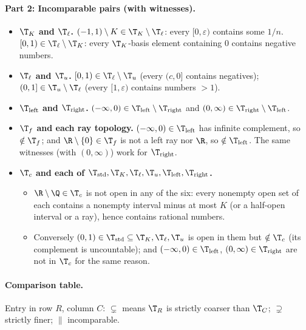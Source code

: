\paragraph{Part 2: Incomparable pairs (with witnesses).}
\begin{itemize}
  \item \textbf{$\T_K$ and $\T_\ell$.} $(-1,1)\setminus K\in\T_K\setminus\T_\ell$: every
        $[0,\varepsilon)$ contains some $1/n$. $[0,1)\in\T_\ell\setminus\T_K$: every
        $\T_K$-basis element containing $0$ contains negative numbers.
  \item \textbf{$\T_\ell$ and $\T_u$.} $[0,1)\in\T_\ell\setminus\T_u$ (every $(c,0]$ contains
        negatives); $(0,1]\in\T_u\setminus\T_\ell$ (every $[1,\varepsilon)$ contains numbers
        $>1$).
  \item \textbf{$\T_{\mathrm{left}}$ and $\T_{\mathrm{right}}$.}
        $(-\infty,0)\in\T_{\mathrm{left}}\setminus\T_{\mathrm{right}}$ and
        $(0,\infty)\in\T_{\mathrm{right}}\setminus\T_{\mathrm{left}}$.
  \item \textbf{$\T_f$ and each ray topology.} $(-\infty,0)\in\T_{\mathrm{left}}$ has infinite
        complement, so $\notin\T_f$; and $\R\setminus\{0\}\in\T_f$ is not a left ray nor $\R$,
        so $\notin\T_{\mathrm{left}}$. The same witnesses (with $(0,\infty)$) work for
        $\T_{\mathrm{right}}$.
  \item \textbf{$\T_c$ and each of $\T_{\mathrm{std}},\T_K,\T_\ell,\T_u,\T_{\mathrm{left}},
        \T_{\mathrm{right}}$.}
        \begin{itemize}[nosep]
          \item $\R\setminus\Q\in\T_c$ is not open in any of the six: every nonempty open set
                of each contains a nonempty interval minus at most $K$ (or a half-open interval
                or a ray), hence contains rational numbers.
          \item Conversely $(0,1)\in\T_{\mathrm{std}}\subseteq\T_K,\T_\ell,\T_u$ is open in them
                but $\notin\T_c$ (its complement is uncountable); and
                $(-\infty,0)\in\T_{\mathrm{left}}$, $(0,\infty)\in\T_{\mathrm{right}}$ are not in
                $\T_c$ for the same reason.
        \end{itemize}
\end{itemize}

\paragraph{Comparison table.}
Entry in row $R$, column $C$: $\subsetneq$ means $\T_R$ is strictly coarser than $\T_C$;
$\supsetneq$ strictly finer; $\parallel$ incomparable.

